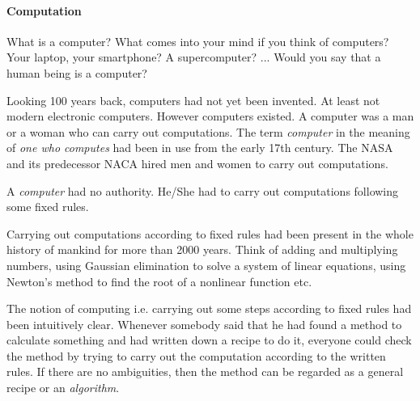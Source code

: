 \begin{comment}
        Polymorphic types (System F): Adding List X, Array X, Pair X Y. Type
        functions mapping types to types.

        Polymorphic functions (System Fω): reverse List X. Functions mapping
        types and objects to objects.

        Dependent types for logic: Expressing type ∀x. P x. An object of this
        type is a function which maps an object x to a proof of P x.
        Computational objects appearing in types.

    Calculus of constructions: Expressive in terms of functions it can express
    and in terms of logical statements it can express. Sweet spot in the desigs
    space of typed lambda calculi.
\end{comment}




\paragraph{Computation}
What is a computer? What comes into your mind if you think of computers? Your
laptop, your smartphone? A supercomputer? ... Would you say that a human being
is a computer?

Looking 100 years back, computers had not yet been invented. At least not modern
electronic computers. However computers existed. A computer was a man or a woman
who can carry out computations. The term \emph{computer} in the meaning of
\emph{one who computes} had been in use from the early 17th century. The NASA
and its predecessor NACA hired men and women to carry out computations.

A \emph{computer} had no authority. He/She had to carry out computations
following some fixed rules.

Carrying out computations according to fixed rules had been present in the whole
history of mankind for more than 2000 years. Think of adding and multiplying
numbers, using Gaussian elimination to solve a system of linear equations, using
Newton's method to find the root of a nonlinear function etc.

The notion of computing i.e. carrying out some steps according to fixed rules
had been intuitively clear. Whenever somebody said that he had found a method to
calculate something and had written down a recipe to do it, everyone could check
the method by trying to carry out the computation according to the written
rules. If there are no ambiguities, then the method can be regarded as a general
recipe or an \emph{algorithm}.



